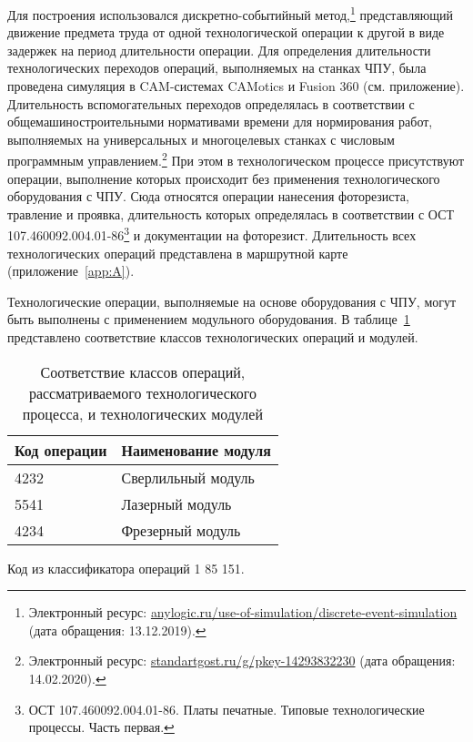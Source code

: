Для построения использовался дискретно-событийный метод,\footnote{Электронный ресурс: {\tiny\url{anylogic.ru/use-of-simulation/discrete-event-simulation}} (дата обращения: 13.12.2019).} представляющий движение предмета труда от одной технологической операции к другой в виде задержек на период длительности операции. Для определения длительности технологических переходов операций, выполняемых на станках ЧПУ, была проведена симуляция в CAM-системах CAMotics и Fusion 360 (см. приложение). Длительность вспомогательных переходов определялась в соответствии с общемашиностроительными нормативами времени для нормирования работ, выполняемых на универсальных и многоцелевых станках с числовым программным управлением.\footnote{Электронный ресурс: \url{standartgost.ru/g/pkey-14293832230} (дата обращения: 14.02.2020).} При этом в технологическом процессе присутствуют операции, выполнение которых происходит без применения технологического оборудования с ЧПУ. Сюда относятся операции нанесения фоторезиста, травление и проявка, длительность которых определялась в соответствии с ОСТ 107.460092.004.01-86\footnote{ОСТ 107.460092.004.01-86. Платы печатные. Типовые технологические процессы. Часть первая.} и документации на фоторезист. Длительность всех технологических операций представлена в маршрутной карте (приложение~\cref{app:A}).

Технологические операции, выполняемые на основе оборудования с ЧПУ, могут быть выполнены с применением модульного оборудования. В таблице~\cref{tab:cnc-modules} представлено соответствие классов технологических операций и модулей.

\begin{table} [!htb]
	\centering
	\caption{Соответствие классов операций, рассматриваемого технологического процесса, и технологических модулей} \vspace{4pt}
	\label{tab:cnc-modules}
	\begin{threeparttable}
		\begin{tabularx}{\linewidth}{ll}
			\toprule
			\textbf{Код операции\tnote{1}} & \textbf{Наименование модуля} \\
			\midrule
			4232 & Сверлильный модуль \\
			5541 & Лазерный модуль \\
			4234 & Фрезерный модуль \\
			\bottomrule
		\end{tabularx}
		\begin{tablenotes} \footnotesize
			\item [1] Код из классификатора операций 1 85 151.
		\end{tablenotes}
	\end{threeparttable}
\end{table}

